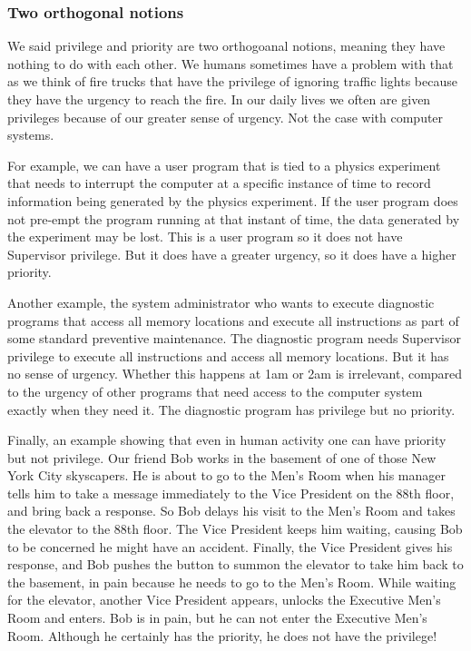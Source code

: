 \documentclass{patt}
\begin{document}
\subsubsection{Two orthogonal notions}
We said privilege and priority are two orthogoanal notions, meaning they have
nothing to do with each other.  We humans sometimes have a problem with that as
we think of fire trucks that have the privilege of ignoring traffic lights
because they have the urgency to reach the fire.  In our daily lives we often
are given privileges because of our greater sense of urgency.  Not the case
with computer systems.  

For example, we can have a user program that is tied
to a physics experiment that needs to interrupt the computer at a specific
instance of time to record information being generated by the physics 
experiment.  If the user program does not pre-empt the program running at that
instant of time, the data generated by the experiment may be lost.  This is
a user program so it does not have Supervisor privilege.  But it does have a 
greater urgency, so it does have a higher priority.

Another example, the system administrator who wants to execute diagnostic
programs that access all memory locations and execute all instructions as part 
of some standard preventive maintenance.  The diagnostic program needs
Supervisor privilege to execute all instructions and access all memory 
locations.  But it has no sense of urgency.  Whether this happens at 1am or 
2am is irrelevant, compared to the urgency of other programs that need access 
to the computer system exactly when they need it.  The diagnostic program has 
privilege but no priority.   
   
Finally, an example showing that even in human activity one can have priority
but not privilege.  Our friend Bob works in the basement of one of those 
New York City skyscapers.  He is about to go to the Men's Room when his 
manager tells him to take a message immediately to the Vice President on the 
88th floor, and bring back a response.  So Bob delays his visit to the 
Men's Room and takes the elevator to the 88th floor.  The Vice President 
keeps him waiting, causing Bob to be concerned he might have an accident.  
Finally, the Vice President gives his response, and Bob pushes the button 
to summon the elevator to take him back to the basement, in pain because he 
needs to go to the Men's Room.  While waiting for
the elevator, another Vice President appears, unlocks the Executive Men's Room
and enters.  Bob is in pain, but he can not enter the Executive Men's
Room.  Although he certainly has the priority, he does not have the privilege! 
\end{document}
